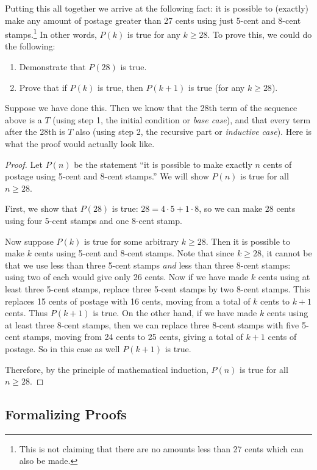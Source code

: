 \documentclass[12pt]{article}
\begin{document}
Putting this all together we arrive at the following fact: it is possible to (exactly) make any amount of postage greater than 27 cents using just 5-cent and 8-cent stamps.\footnote{This is not claiming that there are no amounts less than 27 cents which can also be made.}  In other words, $P(k)$ is true for any $k \ge 28$.  To prove this, we could do the following:

\begin{enumerate}
  \item Demonstrate that $P(28)$ is true.
  \item Prove that if $P(k)$ is true, then $P(k+1)$ is true (for any $k \ge 28$).
\end{enumerate}

Suppose we have done this.  Then we know that the 28th term of the sequence above is a $T$ (using step 1, the initial condition or {\em base case}), and that every term after the 28th is $T$ also (using step 2, the recursive part or {\em inductive case}).  Here is what the proof would actually look like.

\begin{proof}
  Let $P(n)$ be the statement ``it is possible to make exactly $n$ cents of postage using 5-cent and 8-cent stamps.''  We will show $P(n)$ is true for all $n \ge 28$.

  First, we show that $P(28)$ is true: $28 =  4 \cdot 5+ 1\cdot 8$, so we can make $28$ cents using four 5-cent stamps and one 8-cent stamp.

  Now suppose $P(k)$ is true for some arbitrary $k \ge 28$.  Then it is possible to make $k$ cents using 5-cent and 8-cent stamps.  Note that since $k \ge 28$, it cannot be that we use less than three 5-cent stamps {\em and} less than three 8-cent stamps: using two of each would give only 26 cents.  Now if we have made $k$ cents using at least three 5-cent stamps, replace three 5-cent stamps by two 8-cent stamps.  This replaces 15 cents of postage with 16 cents, moving from a total of $k$ cents to $k+1$ cents.  Thus $P(k+1)$ is true.  On the other hand, if we have made $k$ cents using at least three 8-cent stamps, then we can replace three 8-cent stamps with five 5-cent stamps, moving from 24 cents to 25 cents, giving a total of $k+1$ cents of postage.  So in this case as well $P(k+1)$ is true.

  Therefore, by the principle of mathematical induction, $P(n)$ is true for all $n \ge 28$.
\end{proof}


\subsection{Formalizing Proofs}
\end{document}
